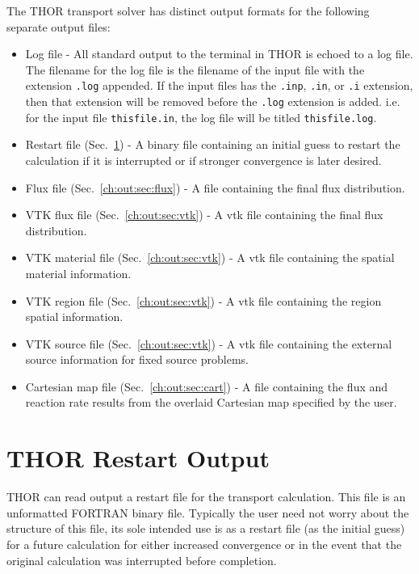 The THOR transport solver has distinct output formats for the following separate output files:
\begin{itemize}
    \item Log file - All standard output to the terminal in THOR is echoed to a log file.
      The filename for the log file is the filename of the input file with the extension \verb".log" appended.
      If the input files has the \verb".inp", \verb".in", or \verb".i" extension, then that extension will be removed before the \verb".log" extension is added.
      i.e. for the input file \verb"thisfile.in", the log file will be titled \verb"thisfile.log".
    \item Restart file (Sec.~\ref{ch:out:sec:restart}) - A binary file containing an initial guess to restart the calculation if it is interrupted or if stronger convergence is later desired.
    \item Flux file (Sec.~\ref{ch:out:sec:flux}) - A file containing the final flux distribution.
    \item VTK flux file (Sec.~\ref{ch:out:sec:vtk}) - A vtk file containing the final flux distribution.
    \item VTK material file (Sec.~\ref{ch:out:sec:vtk}) - A vtk file containing the spatial material information.
    \item VTK region file (Sec.~\ref{ch:out:sec:vtk}) - A vtk file containing the region spatial information.
    \item VTK source file (Sec.~\ref{ch:out:sec:vtk}) - A vtk file containing the external source information for fixed source problems.
    \item Cartesian map file (Sec.~\ref{ch:out:sec:cart}) - A file containing the flux and reaction rate results from the overlaid Cartesian map specified by the user.
\end{itemize}

\section{THOR Restart Output}\label{ch:out:sec:restart}

THOR can read output a restart file for the transport calculation.
This file is an unformatted FORTRAN binary file.
Typically the user need not worry about the structure of this file, its sole intended use is as a restart file (as the initial guess) for a future calculation for either increased convergence or in the event that the original calculation was interrupted before completion.

